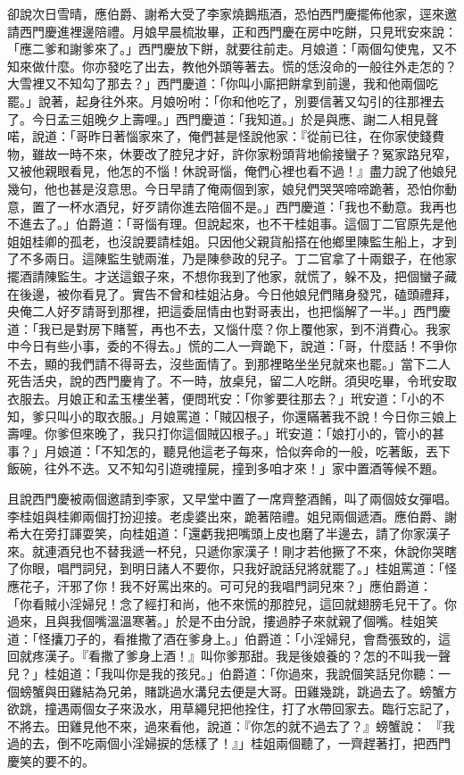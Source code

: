 \begin{showcontents}{}
卻說次日雪晴，應伯爵、謝希大受了李家燒鵝瓶酒，恐怕西門慶擺佈他家，逕來邀請西門慶進裡邊陪禮。月娘早晨梳妝畢，正和西門慶在房中吃餅，只見玳安來說： 「應二爹和謝爹來了。」西門慶放下餅，就要往前走。月娘道：「兩個勾使鬼，又不知來做什麼。你亦發吃了出去，教他外頭等著去。慌的恁沒命的一般往外走怎的？大雪裡又不知勾了那去？」西門慶道：「你叫小廝把餅拿到前邊，我和他兩個吃罷。」說著，起身往外來。月娘吩咐：「你和他吃了，別要信著又勾引的往那裡去了。今日孟三姐晚夕上壽哩。」西門慶道：「我知道。」於是與應、謝二人相見聲喏，說道：「哥昨日著惱家來了，俺們甚是怪說他家：『從前已往，在你家使錢費物，雖故一時不來，休要改了腔兒才好，許你家粉頭背地偷接蠻子？冤家路兒窄，又被他親眼看見，他怎的不惱！休說哥惱，俺們心裡也看不過！』盡力說了他娘兒幾句，他也甚是沒意思。今日早請了俺兩個到家，娘兒們哭哭啼啼跪著，恐怕你動意，置了一杯水酒兒，好歹請你進去陪個不是。」西門慶道：「我也不動意。我再也不進去了。」伯爵道：「哥惱有理。但說起來，也不干桂姐事。這個丁二官原先是他姐姐桂卿的孤老，也沒說要請桂姐。只因他父親貨船搭在他鄉里陳監生船上，才到了不多兩日。這陳監生號兩淮，乃是陳參政的兒子。丁二官拿了十兩銀子，在他家擺酒請陳監生。才送這銀子來，不想你我到了他家，就慌了，躲不及，把個蠻子藏在後邊，被你看見了。實告不曾和桂姐沾身。今日他娘兒們賭身發咒，磕頭禮拜，央俺二人好歹請哥到那裡，把這委屈情由也對哥表出，也把惱解了一半。」西門慶道：「我已是對房下賭誓，再也不去，又惱什麼？你上覆他家，到不消費心。我家中今日有些小事，委的不得去。」慌的二人一齊跪下，說道：「哥，什麼話！不爭你不去，顯的我們請不得哥去，沒些面情了。到那裡略坐坐兒就來也罷。」當下二人死告活央，說的西門慶肯了。不一時，放桌兒，留二人吃餅。須臾吃畢，令玳安取衣服去。月娘正和孟玉樓坐著，便問玳安：「你爹要往那去？」玳安道：「小的不知，爹只叫小的取衣服。」月娘罵道：「賊囚根子，你還瞞著我不說！今日你三娘上壽哩。你爹但來晚了，我只打你這個賊囚根子。」玳安道：「娘打小的，管小的甚事？」月娘道：「不知怎的，聽見他這老子每來，恰似奔命的一般，吃著飯，丟下飯碗，往外不迭。又不知勾引遊魂撞屍，撞到多咱才來！」家中置酒等候不題。

且說西門慶被兩個邀請到李家，又早堂中置了一席齊整酒餚，叫了兩個妓女彈唱。李桂姐與桂卿兩個打扮迎接。老虔婆出來，跪著陪禮。姐兒兩個遞酒。應伯爵、謝希大在旁打諢耍笑，向桂姐道：「還虧我把嘴頭上皮也磨了半邊去，請了你家漢子來。就連酒兒也不替我遞一杯兒，只遞你家漢子！剛才若他撅了不來，休說你哭瞎了你眼，唱門詞兒，到明日諸人不要你，只我好說話兒將就罷了。」桂姐罵道：「怪應花子，汗邪了你！我不好罵出來的。可可兒的我唱門詞兒來？」應伯爵道： 「你看賊小淫婦兒！念了經打和尚，他不來慌的那腔兒，這回就翅膀毛兒干了。你過來，且與我個嘴溫溫寒著。」於是不由分說，摟過脖子來就親了個嘴。桂姐笑道：「怪攮刀子的，看推撒了酒在爹身上。」伯爵道：「小淫婦兒，會喬張致的，這回就疼漢子。『看撒了爹身上酒！』叫你爹那甜。我是後娘養的？怎的不叫我一聲兒？」桂姐道：「我叫你是我的孩兒。」伯爵道：「你過來，我說個笑話兒你聽：一個螃蟹與田雞結為兄弟，賭跳過水溝兒去便是大哥。田雞幾跳，跳過去了。螃蟹方欲跳，撞遇兩個女子來汲水，用草繩兒把他拴住，打了水帶回家去。臨行忘記了，不將去。田雞見他不來，過來看他，說道：『你怎的就不過去了？』螃蟹說： 『我過的去，倒不吃兩個小淫婦捩的恁樣了！』」桂姐兩個聽了，一齊趕著打，把西門慶笑的要不的。


\end{showcontents}
